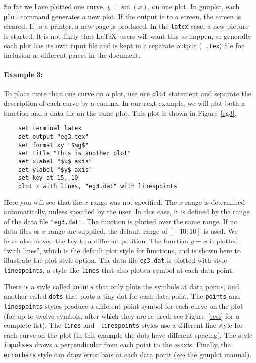 So far we have plotted one curve, $y=\sin(x)$, on one plot. In
gnuplot, each {\tt plot} command generates a new plot. If the output
is to a screen, the screen is cleared. If to a printer, a new page is
produced. In the {\tt latex} case, a new picture is started. It is not
likely that \LaTeX\ users will want this to happen, so generally each
plot has its own input file and is kept in a separate output ({\tt
.tex}) file for inclusion at different places in the document.

\paragraph{Example 3:} To place more than one curve on a plot, use one
{\tt plot} statement and separate the description of each curve by a
comma. In our next example, we will plot both a function and a data
file on the same plot. This plot is shown in Figure~\ref{eg3}.

\singlespace
\begin{verbatim}
    set terminal latex
    set output "eg3.tex"
    set format xy "$%g$"
    set title "This is another plot"
    set xlabel "$x$ axis"
    set ylabel "$y$ axis"
    set key at 15,-10
    plot x with lines, "eg3.dat" with linespoints
\end{verbatim}
\currentspace


Here you will see that the $x$ range was not specified. The $x$ range
is determined automatically, unless specified by the user.  In
this case, it is defined by the range of the data file
\verb+"eg3.dat"+. The function is plotted over the same range. If no
data files or $x$ range are supplied, the default range of $[-10:10]$
is used. We have also moved the key to a different position.  The
function $y=x$ is plotted ``with lines'', which is the default plot
style for functions, and is shown here to illustrate the plot style
option.  The data file {\tt eg3.dat} is plotted with style {\tt
linespoints}, a style like {\tt lines} that also plots a symbol at
each data point.

There is a style called {\tt points} that only plots the symbols at
data points, and another called {\tt dots} that plots a tiny dot for
each data point.  The {\tt points} and {\tt linespoints} styles
produce a different point symbol for each curve on the plot (for up to
twelve symbols, after which they are re-used; see
Figure~\ref{test} for a complete list). The {\tt lines} and {\tt
linespoints} styles use a different line style for each curve on the
plot (in this example the dots have different spacing). The
style {\tt impulses} draws a perpendicular from each point to the
$x$-axis. Finally, the {\tt errorbars} style can draw error bars at
each data point (see the gnuplot manual).

